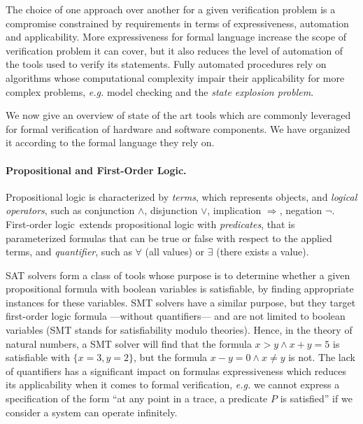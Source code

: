 The choice of one approach over another for a given verification problem is a
compromise constrained by requirements in terms of expressiveness, automation
and applicability.
%
More expressiveness for formal language increase the scope of verification
problem it can cover, but it also reduces the level of automation of the tools
used to verify its statements.
%
Fully automated procedures rely on algorithms whose computational complexity
impair their applicability for more complex problems, \emph{e.g.}  model
checking and the \emph{state explosion problem}.

We now give an overview of state of the art tools which are commonly leveraged
for formal verification of hardware and software components.
%
We have organized it according to the formal language they rely on.

\paragraph{Propositional and First-Order Logic.}
%
Propositional logic is characterized by \emph{terms}, which represents objects,
and \emph{logical operators}, such as conjunction \( \wedge \), disjunction
\( \vee \), implication \( \Rightarrow \), negation \( \neg \).
%
First-order logic\,\cite{smullyan2012fol} extends propositional logic with
\emph{predicates}, that is parameterized formulas that can be true or false with
respect to the applied terms, and \emph{quantifier}, such as \( \forall \) (all
values) or \( \exists \) (there exists a value).

SAT solvers  form a class of tools whose purpose is to determine whether a
given propositional formula with boolean variables is satisfiable, by finding
appropriate instances for these variables.
%
SMT solvers have a similar purpose, but they target first-order logic formula
---without quantifiers--- and are not limited to boolean variables (SMT stands
for satisfiability modulo theories).
%
Hence, in the theory of natural numbers, a SMT solver will find that the formula
\( x > y \wedge x + y = 5 \) is satisfiable with \( \{ x = 3, y = 2 \} \), but
the formula \( x - y = 0 \wedge x \neq y \) is not.
%
The lack of quantifiers has a significant impact on formulas expressiveness
which reduces its applicability when it comes to formal verification,
\emph{e.g.} we cannot express a specification of the form ``at any point in a
trace, a predicate \( P \) is satisfied'' if we consider a system can operate
infinitely.

